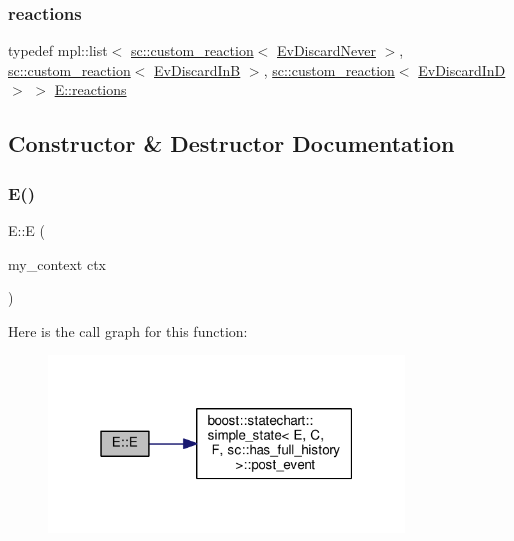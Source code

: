 \mbox{\label{struct_e_a74945ed9425f80f1034e2ae1100d53ac}} 
\subsubsection{\texorpdfstring{reactions}{reactions}\hspace{0.1cm}{\footnotesize\ttfamily [4/4]}}
{\footnotesize\ttfamily typedef mpl\+::list$<$ \mbox{\hyperlink{classboost_1_1statechart_1_1custom__reaction}{sc\+::custom\+\_\+reaction}}$<$ \mbox{\hyperlink{struct_ev_discard_never}{Ev\+Discard\+Never}} $>$, \mbox{\hyperlink{classboost_1_1statechart_1_1custom__reaction}{sc\+::custom\+\_\+reaction}}$<$ \mbox{\hyperlink{struct_ev_discard_in_b}{Ev\+Discard\+InB}} $>$, \mbox{\hyperlink{classboost_1_1statechart_1_1custom__reaction}{sc\+::custom\+\_\+reaction}}$<$ \mbox{\hyperlink{struct_ev_discard_in_d}{Ev\+Discard\+InD}} $>$ $>$ \mbox{\hyperlink{struct_e_a74945ed9425f80f1034e2ae1100d53ac}{E\+::reactions}}}



\subsection{Constructor \& Destructor Documentation}
\mbox{\label{struct_e_a0fc5614316a5cebd4a4a206af9cd1bde}} 
\subsubsection{\texorpdfstring{E()}{E()}}
{\footnotesize\ttfamily E\+::E (\begin{DoxyParamCaption}\item[{my\+\_\+context}]{ctx }\end{DoxyParamCaption})\hspace{0.3cm}{\ttfamily [inline]}}

Here is the call graph for this function\+:
\nopagebreak
\begin{figure}[H]
\begin{center}
\leavevmode
\includegraphics[width=268pt]{struct_e_a0fc5614316a5cebd4a4a206af9cd1bde_cgraph}
\end{center}
\end{figure}


